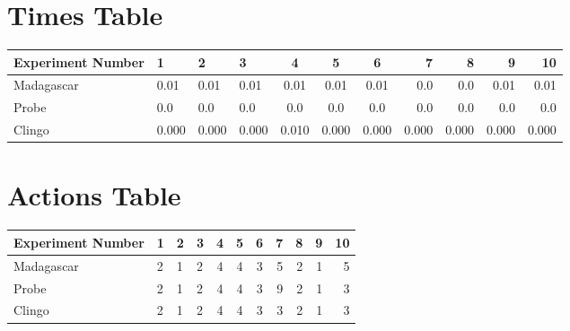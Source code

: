 \documentclass[8pt]{article}
\begin{document}
\begin{landscape}
\section{Times Table}\begin{tabular}{ | l | l | l | l | c | c | c | r | r | r | r | }\hline
Experiment Number & 1 & 2 & 3 & 4 & 5 & 6 & 7 & 8 & 9 & 10\\  \hline
Madagascar & 0.01 & 0.01 & 0.01 & 0.01 & 0.01 & 0.01 & 0.0 & 0.0 & 0.01 & 0.01\\  \hline
Probe & 0.0 & 0.0 & 0.0 & 0.0 & 0.0 & 0.0 & 0.0 & 0.0 & 0.0 & 0.0\\  \hline
Clingo & 0.000 & 0.000 & 0.000 & 0.010 & 0.000 & 0.000 & 0.000 & 0.000 & 0.000 & 0.000\\  \hline
\end{tabular}
\section{Actions Table}\begin{tabular}{ | l | l | l | l | c | c | c | r | r | r | r | }\hline
Experiment Number & 1 & 2 & 3 & 4 & 5 & 6 & 7 & 8 & 9 & 10\\ \hline
 Madagascar & 2 & 1 & 2 & 4 & 4 & 3 & 5 & 2 & 1 & 5\\ \hline
 Probe & 2 & 1 & 2 & 4 & 4 & 3 & 9 & 2 & 1 & 3\\ \hline
 Clingo & 2 & 1 & 2 & 4 & 4 & 3 & 3 & 2 & 1 & 3\\ \hline
\end{tabular}
\end{landscape}
\end{document}
